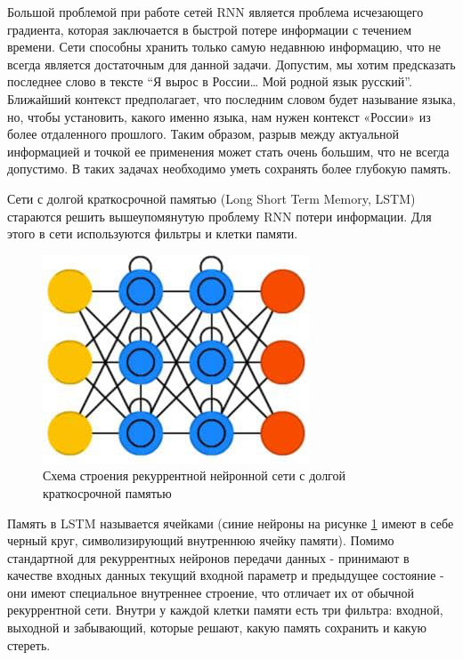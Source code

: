 \begin{itemize}
\begin{itemize}
Большой проблемой при работе сетей RNN является проблема исчезающего градиента, которая заключается в быстрой потере информации с течением времени. 
Сети способны хранить только самую недавнюю информацию, что не всегда является достаточным для данной задачи. 
Допустим, мы хотим предсказать последнее слово в тексте “Я вырос в России… Мой родной язык русский”. 
Ближайший контекст предполагает, что последним словом будет называние языка, но, чтобы установить, 
какого именно языка, нам нужен контекст «России» из более отдаленного прошлого. Таким образом, 
разрыв между актуальной информацией и точкой ее применения может стать очень большим, что не всегда допустимо. 
В таких задачах необходимо уметь сохранять более глубокую память.

Сети с долгой краткосрочной памятью (Long Short Term Memory, LSTM) стараются решить вышеупомянутую проблему RNN потери информации. 
Для этого в сети используются фильтры и клетки памяти.

\begin{figure}[h]
\includegraphics[width=0.75\columnwidth]{./img/recur_2.jpg}
\centering
\caption{Схема строения рекуррентной нейронной сети с долгой краткосрочной памятью}
\label{pic:recur_2}
\end{figure}

Память в LSTM называется ячейками (синие нейроны на рисунке  \ref{pic:recur_2} имеют в себе черный круг, 
символизирующий внутреннюю ячейку памяти). Помимо стандартной для 
рекуррентных нейронов передачи данных - принимают в качестве входных данных 
текущий входной параметр и предыдущее состояние - они имеют специальное внутреннее строение, 
что отличает их от обычной рекуррентной сети. 
Внутри у каждой клетки памяти есть три фильтра: входной, выходной и забывающий, которые решают, какую память сохранить и какую стереть.


\end{itemize}
\end{itemize}
